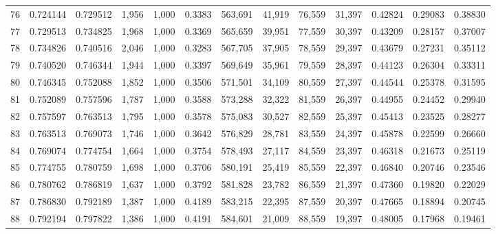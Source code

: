 \begin{tabular}{rrrrrrrrrrrrr}
76  &  0.724144 &  0.729512 &   1,956 &  1,000 &                                     0.3383 &  563,691 &   41,919 &   76,559 &   31,397 &  0.42824 &  0.29083 &  0.38830 \\
77  &  0.729513 &  0.734825 &   1,968 &  1,000 &                                     0.3369 &  565,659 &   39,951 &   77,559 &   30,397 &  0.43209 &  0.28157 &  0.37007 \\
78  &  0.734826 &  0.740516 &   2,046 &  1,000 &                                     0.3283 &  567,705 &   37,905 &   78,559 &   29,397 &  0.43679 &  0.27231 &  0.35112 \\
79  &  0.740520 &  0.746344 &   1,944 &  1,000 &                                     0.3397 &  569,649 &   35,961 &   79,559 &   28,397 &  0.44123 &  0.26304 &  0.33311 \\
80  &  0.746345 &  0.752088 &   1,852 &  1,000 &                                     0.3506 &  571,501 &   34,109 &   80,559 &   27,397 &  0.44544 &  0.25378 &  0.31595 \\
81  &  0.752089 &  0.757596 &   1,787 &  1,000 &                                     0.3588 &  573,288 &   32,322 &   81,559 &   26,397 &  0.44955 &  0.24452 &  0.29940 \\
82  &  0.757597 &  0.763513 &   1,795 &  1,000 &                                     0.3578 &  575,083 &   30,527 &   82,559 &   25,397 &  0.45413 &  0.23525 &  0.28277 \\
83  &  0.763513 &  0.769073 &   1,746 &  1,000 &                                     0.3642 &  576,829 &   28,781 &   83,559 &   24,397 &  0.45878 &  0.22599 &  0.26660 \\
84  &  0.769074 &  0.774754 &   1,664 &  1,000 &                                     0.3754 &  578,493 &   27,117 &   84,559 &   23,397 &  0.46318 &  0.21673 &  0.25119 \\
85  &  0.774755 &  0.780759 &   1,698 &  1,000 &                                     0.3706 &  580,191 &   25,419 &   85,559 &   22,397 &  0.46840 &  0.20746 &  0.23546 \\
86  &  0.780762 &  0.786819 &   1,637 &  1,000 &                                     0.3792 &  581,828 &   23,782 &   86,559 &   21,397 &  0.47360 &  0.19820 &  0.22029 \\
87  &  0.786830 &  0.792189 &   1,387 &  1,000 &                                     0.4189 &  583,215 &   22,395 &   87,559 &   20,397 &  0.47665 &  0.18894 &  0.20745 \\
88  &  0.792194 &  0.797822 &   1,386 &  1,000 &                                     0.4191 &  584,601 &   21,009 &   88,559 &   19,397 &  0.48005 &  0.17968 &  0.19461 \\

\end{tabular}
